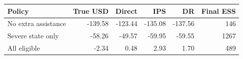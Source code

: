 \begin{tabular}{@{}lrrrrr@{}}
\toprule
Policy & True USD & Direct & IPS & DR & Final ESS\\
\midrule
No extra assistance & -139.58 & -123.44 & -135.08 & -137.56 & 146\\
Severe state only & -58.26 & -49.57 & -59.95 & -59.55 & 1267\\
All eligible & -2.34 & 0.48 & 2.93 & 1.70 & 489\\
\bottomrule
\end{tabular}
